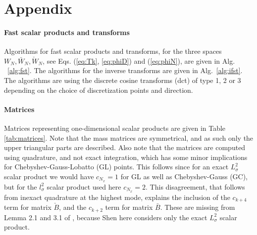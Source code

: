 \documentclass[preprint]{elsarticle}
\newcommand{\N}[1]{\check{#1}}
\newcommand{\D}[1]{\bar{#1}}
\begin{document}
%
%
%
%
%
%



\section*{Appendix}
\label{sec:app}

\paragraph*{Fast scalar products and transforms}
Algorithms for fast scalar products and transforms, for the three 
spaces $W_N, \D{W}_N, \N{W}_N$, see Eqs. (\ref{eq:Tk}, \ref{eq:phiD}) and (\ref{eq:phiN}), are given in Alg. ~\ref{alg:fst}. The 
algorithms for the inverse transforms are given in Alg.~\ref{alg:ifst}. The 
algorithms are using the discrete cosine transforms (dct) of type 1, 2 or 3 
depending on the choice of discretization points and direction.

\paragraph*{Matrices}
Matrices representing one-dimensional scalar products are given in Table \ref{tab:matrices}. Note that the mass matrices are symmetrical, and as such only the upper triangular parts are described. Also note that the matrices are computed using quadrature, and not exact integration, which has some minor implications for Chebyshev-Gauss-Lobatto (GL) points. This follows since for an exact $L^2_{\sigma}$ scalar product we would have $c_{N_x}=1$ for GL as well as Chebyshev-Gauss (GC), but for the $l^2_{\sigma}$ scalar product used here $c_{N_x}=2$. This disagreement, that follows from inexact quadrature at the highest mode, explains the inclusion of the $c_{k+4}$ term for matrix $\N{B}$, and the $c_{k+2}$ term for matrix $\D{B}$. These are missing from Lemma 2.1 and 3.1 of \cite{Shen95}, because Shen here considers only the exact $L^2_{\sigma}$ scalar product.
\end{document}
